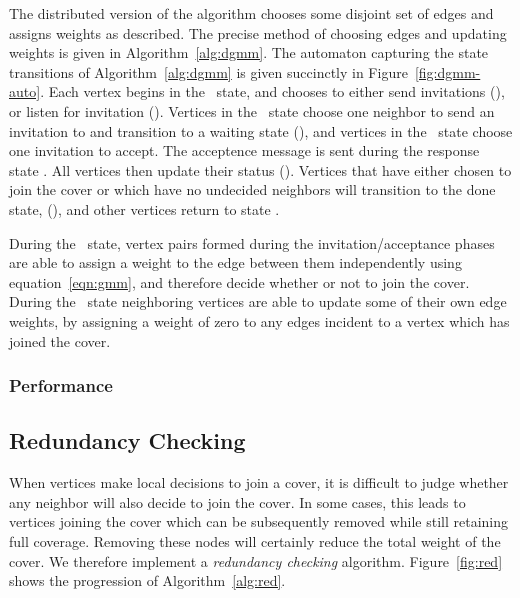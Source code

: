 

The distributed version of the algorithm chooses some disjoint set of edges and assigns weights as described. The precise method of choosing edges and updating weights is given in Algorithm~\ref{alg:dgmm}. The automaton capturing the state transitions of Algorithm~\ref{alg:dgmm} is given succinctly in Figure~\ref{fig:dgmm-auto}. Each vertex begins in the \cCd\ state, and chooses to either send invitations (\cId), or listen for invitation (\cLd). Vertices in the \cId\ state choose one neighbor to send an invitation to and transition to a waiting state (\cWd), and vertices in the \cLd\ state choose one invitation to accept. The acceptence message is sent during the response state \cRd. All vertices then update their status (\cUd). Vertices that have either chosen to join the cover or which have no undecided neighbors will transition to the done state, (\cDd), and other vertices return to state \cCd.  



During the \cUd\ state, vertex pairs formed during the invitation/acceptance phases are able to assign a weight to the edge between them independently using equation~\ref{eqn:gmm}, and therefore decide whether or not to join the cover. During the \cEd\ state neighboring vertices are able to update some of their own edge weights, by assigning a weight of zero to any edges incident to a vertex which has joined the cover.



\subsubsection{Performance}




\subsection{Redundancy Checking}

When vertices make local decisions to join a cover, it is difficult to judge whether any neighbor will also decide to join the cover. In some cases, this leads to vertices joining the cover which can be subsequently removed while still retaining full coverage. Removing these nodes will certainly reduce the total weight of the cover. We therefore implement a {\em redundancy checking} algorithm. Figure~\ref{fig:red} shows the progression of Algorithm~\ref{alg:red}.

